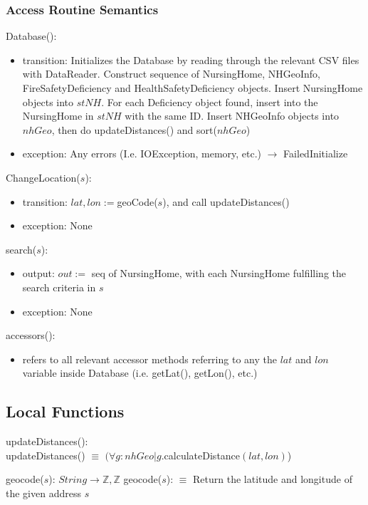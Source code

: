 \documentclass[12pt]{article}
\begin{document}
\subsubsection* {Access Routine Semantics}
\noindent Database():
\begin{itemize}
\item transition: Initializes the Database by reading through the relevant CSV files with DataReader. Construct sequence of NursingHome, NHGeoInfo, FireSafetyDeficiency and HealthSafetyDeficiency objects. Insert NursingHome objects into $stNH$. For each Deficiency object found, insert into the NursingHome in $stNH$ with the same ID. Insert NHGeoInfo objects into $nhGeo$, then do updateDistances() and sort($nhGeo$)
\item exception: Any errors (I.e. IOException, memory, etc.) $\rightarrow$ FailedInitialize
\end{itemize}

\noindent ChangeLocation($s$):
\begin{itemize}
\item transition: $lat, lon := $geoCode($s$), and call updateDistances()
\item exception: None
\end{itemize}

\noindent search($s$):
\begin{itemize}
\item output: $out := $ seq of NursingHome, with each NursingHome fulfilling the search criteria in $s$
\item exception: None
\end{itemize}

\noindent accessors():
\begin{itemize}
\item refers to all relevant accessor methods referring to any the $lat$ and $lon$ variable inside Database (i.e. getLat(), getLon(),  etc.)
\end{itemize}

\subsection*{Local Functions}
\noindent updateDistances(): \\
\noindent updateDistances() $ \equiv $ $(\forall g : nhGeo | g.$calculateDistance$(lat, lon)$)

\noindent geocode($s$): $String \rightarrow \mathbb{Z}, \mathbb{Z}$
\noindent geocode($s$): $ \equiv $ Return the latitude and longitude of the given address $s$
\end{document}
